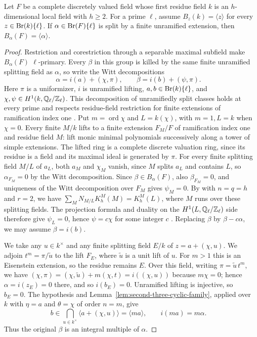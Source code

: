 \begin{lemma}\label{lem:second-three-witt-common-kernel}
Let $F$ be a complete discretely valued field whose first residue field $k$ is an $h$-dimensional local field with $h\ge2$.
For a prime $\ell$, assume $B_z(k)=\langle z\rangle$ for every $z\in\operatorname{Br}(k)\{\ell\}$.
If $\alpha\in\operatorname{Br}(F)\{\ell\}$ is split by a finite unramified extension, then $B_\alpha(F)=\langle\alpha\rangle$.
\end{lemma}
\begin{proof}
Restriction and corestriction through a separable maximal subfield make $B_\alpha(F)$ $\ell$-primary.
Every $\beta$ in this group is killed by the same finite unramified splitting field as $\alpha$, so write the Witt decompositions
\[
 \alpha=i(a)+(\chi,\pi),\qquad\beta=i(b)+(\psi,\pi).
\]
Here $\pi$ is a uniformizer, $i$ is unramified lifting, $a,b\in\operatorname{Br}(k)\{\ell\}$, and $\chi,\psi\in H^1(k,\mathbb Q_\ell/\mathbb Z_\ell)$.
This decomposition of unramifiedly split classes holds at every prime and respects residue-field restriction for finite extensions of ramification index one \cite[\S3, (3.3)--(3.4), Theorem 3.2]{AljadeffSonnWadsworth}.
Put $m=\operatorname{ord}\chi$ and $L=k(\chi)$, with $m=1,L=k$ when $\chi=0$.
Every finite $M/k$ lifts to a finite extension $F_M/F$ of ramification index one and residue field $M$: lift monic minimal polynomials successively along a tower of simple extensions.
The lifted ring is a complete discrete valuation ring, since its residue is a field and its maximal ideal is generated by $\pi$.
For every finite splitting field $M/L$ of $a_L$, both $a_M$ and $\chi_M$ vanish, since $M$ splits $a_L$ and contains $L$, so $\alpha_{F_M}=0$ by the Witt decomposition.
Since $\beta\in B_\alpha(F)$, also $\beta_{F_M}=0$, and uniqueness of the Witt decomposition over $F_M$ gives $\psi_M=0$.
By \cite[Proposition 5]{KatoExistence} with $n=q=h$ and $r=2$, we have $\sum_M N_{M/L}K_h^M(M)=K_h^M(L)$, where $M$ runs over these splitting fields.
The projection formula and duality on the $H^1(L,\mathbb Q_\ell/\mathbb Z_\ell)$ side therefore give $\psi_L=0$, hence $\psi=c\chi$ for some integer $c$ \cite[Proposition 5, Theorem 2]{KatoExistence}.
Replacing $\beta$ by $\beta-c\alpha$, we may assume $\beta=i(b)$.

We take any $u\in k^\times$ and any finite splitting field $E/k$ of $z=a+(\chi,u)$.
We adjoin $t^m=\pi/\tilde u$ to the lift $F_E$, where $\tilde u$ is a unit lift of $u$.
For $m>1$ this is an Eisenstein extension, so the residue remains $E$.
Over this field, writing $\pi=\tilde u\,t^m$, we have $(\chi,\pi)=(\chi,\tilde u)+m(\chi,t)=i((\chi,u))$ because $m\chi=0$; hence $\alpha=i(z_E)=0$ there, and so $i(b_E)=0$.
Unramified lifting is injective, so $b_E=0$.
The hypothesis and Lemma~\ref{lem:second-three-cyclic-family}, applied over $k$ with $\eta=a$ and $\theta=\chi$ of order $n=m$, give
\[
 b\in\bigcap_{u\in k^\times}\langle a+(\chi,u)\rangle
   =\langle ma\rangle,\qquad i(ma)=m\alpha .
\]
Thus the original $\beta$ is an integral multiple of $\alpha$.
\end{proof}

